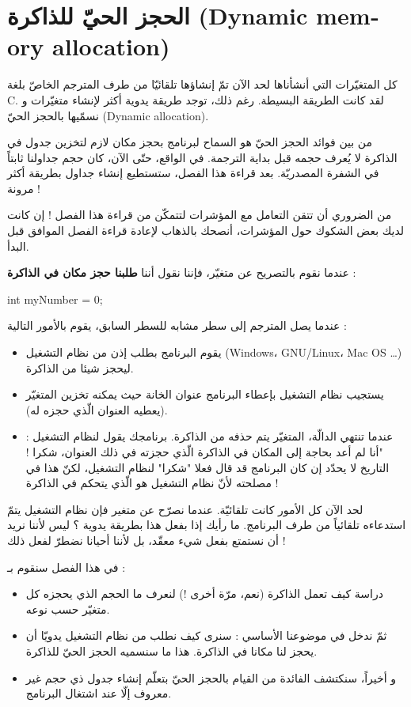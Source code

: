 \chapter{الحجز الحيّ للذاكرة
(\textenglish{Dynamic memory allocation})}

كل المتغيّرات التي أنشأناها لحد الآن تمّ إنشاؤها تلقائيّا من طرف المترجم الخاصّ بلغة
\textenglish{C}.
لقد كانت الطريقة البسيطة. رغم ذلك، توجد طريقة يدوية أكثر لإنشاء متغيّرات و نسمّيها بالحجز الحيّ
(\textenglish{Dynamic allocation}).

من بين فوائد الحجز الحيّ هو السماح لبرنامج بحجز مكان لازم لتخزين جدول في الذاكرة لا يُعرف حجمه قبل بداية الترجمة. في الواقع، حتّى الآن، كان حجم جداولنا ثابتاً في الشفرة المصدريّة. بعد قراءة هذا الفصل، ستستطيع إنشاء جداول بطريقة أكثر مرونة !

من الضروري أن تتقن التعامل مع المؤشرات لتتمكّن من قراءة هذا الفصل ! إن كانت لديك بعض الشكوك حول المؤشرات، أنصحك بالذهاب لإعادة قراءة الفصل الموافق قبل البدأ.

عندما نقوم بالتصريح عن متغيّر، فإننا نقول أننا
\textbf{طلبنا حجز مكان في الذاكرة} :

\begin{Csource}
int myNumber = 0;
\end{Csource}

عندما يصل المترجم إلى سطر مشابه للسطر السابق، يقوم بالأمور التالية :

\begin{itemize}
  \item يقوم البرنامج بطلب إذن من نظام التشغيل
(\textenglish{Windows}، \textenglish{GNU/Linux}، \textenglish{Mac OS} \dots)
ليحجز شيئا من الذاكرة.
  \item يستجيب نظام التشغيل بإعطاء البرنامج عنوان الخانة حيث يمكنه تخزين المتغيّر (يعطيه العنوان الّذي حجزه له).
  \item عندما تنتهي الدالّة، المتغيّر يتم حذفه من الذاكرة. برنامجك يقول لنظام التشغيل : "أنا لم أعد بحاجة إلى المكان في الذاكرة الّذي حجزته في ذلك العنوان، شكرا ! التاريخ لا يحدّد إن كان البرنامج قد قال فعلا "شكرا" لنظام التشغيل، لكنّ هذا في مصلحته لأنّ نظام التشغيل هو الّذي يتحكم في الذاكرة !
\end{itemize}

لحد الآن كل الأمور كانت تلقائيّة. عندما نصرّح عن متغير فإن نظام التشغيل يتمّ استدعاءه تلقائياً من طرف البرنامج.
ما رأيك إذا بفعل هذا بطريقة يدوية ؟ ليس لأننا نريد أن نستمتع بفعل شيء معقّد، بل لأننا أحيانا نضطرّ لفعل ذلك !

في هذا الفصل سنقوم بـ :

\begin{itemize}
  \item دراسة كيف تعمل الذاكرة (نعم، مرّة أخرى !) لنعرف ما الحجم الذي يحجزه كل متغيّر حسب نوعه.
  \item ثمّ ندخل في موضوعنا الأساسي : سنرى كيف نطلب من نظام التشغيل يدويّا أن يحجز لنا مكانا في الذاكرة. هذا ما سنسميه الحجز الحيّ للذاكرة.
  \item و أخيراً، سنكتشف الفائدة من القيام بالحجز الحيّ بتعلّم إنشاء جدول ذي حجم غير معروف إلّا عند اشتغال البرنامج.
\end{itemize}

